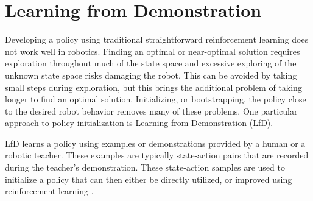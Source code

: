 \documentclass{article}
\begin{document}
%
%
%
%






\section{Learning from Demonstration}
\label{sec:Learning from Demonstration}
Developing a policy using traditional straightforward reinforcement learning does not work well in robotics. Finding an optimal or near-optimal solution requires exploration throughout much of the state space and excessive exploring of the unknown state space risks damaging the robot. This can be avoided by taking small steps during exploration, but this brings the additional problem of taking longer to find an optimal solution. Initializing, or bootstrapping, the policy close to the desired robot behavior removes many of these problems. One particular approach to policy initialization is Learning from Demonstration (LfD).

LfD learns a policy using examples or demonstrations provided by a human or a robotic teacher. These examples are typically state-action pairs that are recorded during the teacher's demonstration. These state-action samples are used to initialize a policy that can then either be directly utilized, or improved using reinforcement learning \cite{Argall:2009:SRL:1523530.1524008}.
\end{document}

